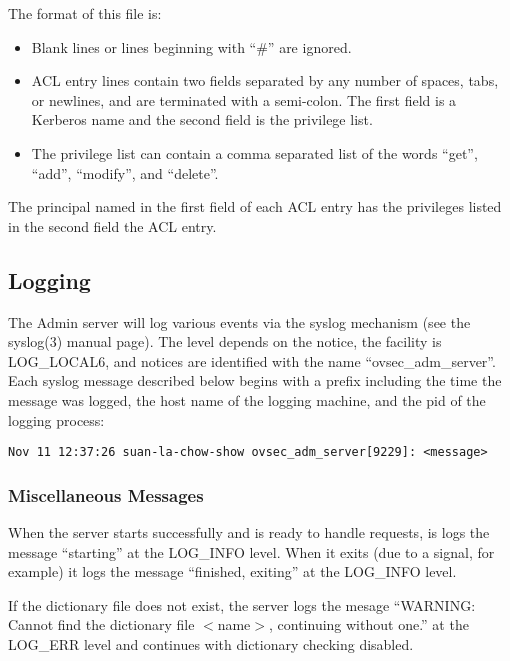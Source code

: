 The format of this file is:

\begin{itemize}
\item Blank lines or lines beginning with ``\#'' are ignored.

\item ACL entry lines contain two fields separated by any number of
spaces, tabs, or newlines, and are terminated with a semi-colon.  The
first field is a Kerberos name and the second field is the privilege
list.

\item The privilege list can contain a comma separated list of the
words ``get'', ``add'', ``modify'', and ``delete''.
\end{itemize}

The principal named in the first field of each ACL entry has the
privileges listed in the second field the ACL entry.

\subsection{Logging}

The Admin server will log various events via the syslog mechanism (see
the syslog(3) manual page).  The level depends on the notice, the
facility is LOG_LOCAL6, and notices are identified with the name
``ovsec_adm_server''.  Each syslog message described below begins with
a prefix including the time the message was logged, the host name of
the logging machine, and the pid of the logging process:

\begin{verbatim}
Nov 11 12:37:26 suan-la-chow-show ovsec_adm_server[9229]: <message>
\end{verbatim}

\subsubsection{Miscellaneous Messages}

When the server starts successfully and is ready to handle requests,
is logs the message ``starting'' at the LOG_INFO level.  When it exits
(due to a signal, for example) it logs the message ``finished,
exiting'' at the LOG_INFO level.

If the dictionary file does not exist, the server logs the mesage
``WARNING: Cannot find the dictionary file $<$name$>$, continuing
without one.'' at the LOG_ERR level and continues with dictionary
checking disabled.

